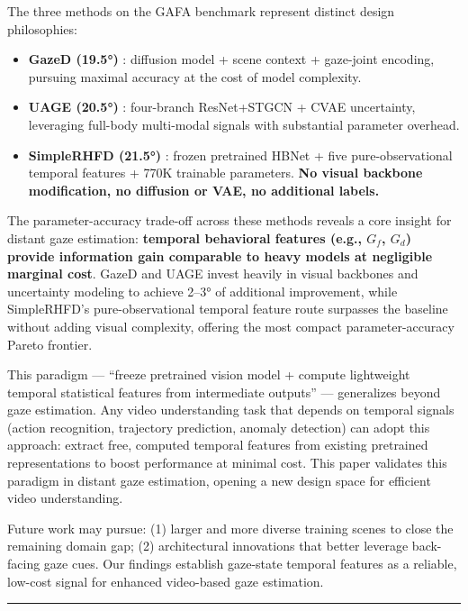 \documentclass[
]{article}
\providecommand{\tightlist}{%
  \setlength{\itemsep}{0pt}\setlength{\parskip}{0pt}}
\begin{document}
The three methods on the GAFA benchmark represent distinct design
philosophies:

\begin{itemize}
\tightlist
\item
  \textbf{GazeD (19.5°)} : diffusion model + scene context + gaze-joint
  encoding, pursuing maximal accuracy at the cost of model complexity.
\item
  \textbf{UAGE (20.5°)} : four-branch ResNet+STGCN + CVAE uncertainty,
  leveraging full-body multi-modal signals with substantial parameter
  overhead.
\item
  \textbf{SimpleRHFD (21.5°)} : frozen pretrained HBNet + five
  pure-observational temporal features + 770K trainable parameters.
  \textbf{No visual backbone modification, no diffusion or VAE, no
  additional labels.}
\end{itemize}

The parameter-accuracy trade-off across these methods reveals a core
insight for distant gaze estimation: \textbf{temporal behavioral
features (e.g., \(G_f\), \(G_d\)) provide information gain comparable to
heavy models at negligible marginal cost}. GazeD and UAGE invest heavily
in visual backbones and uncertainty modeling to achieve 2--3° of
additional improvement, while SimpleRHFD's pure-observational temporal
feature route surpasses the baseline without adding visual complexity,
offering the most compact parameter-accuracy Pareto frontier.

This paradigm --- ``freeze pretrained vision model + compute lightweight
temporal statistical features from intermediate outputs'' ---
generalizes beyond gaze estimation. Any video understanding task that
depends on temporal signals (action recognition, trajectory prediction,
anomaly detection) can adopt this approach: extract free, computed
temporal features from existing pretrained representations to boost
performance at minimal cost. This paper validates this paradigm in
distant gaze estimation, opening a new design space for efficient video
understanding.

Future work may pursue: (1) larger and more diverse training scenes to
close the remaining domain gap; (2) architectural innovations that
better leverage back-facing gaze cues. Our findings establish gaze-state
temporal features as a reliable, low-cost signal for enhanced
video-based gaze estimation.

\begin{center}\rule{0.5\linewidth}{0.5pt}\end{center}
\end{document}
